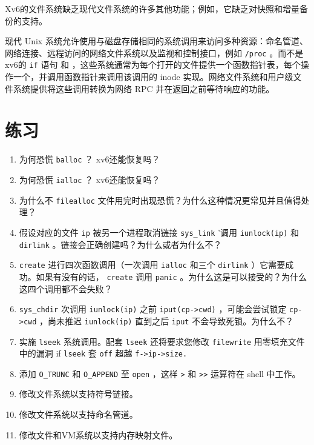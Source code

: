 \documentclass[UTF8]{article}
\begin{document}
Xv6的文件系统缺乏现代文件系统的许多其他功能；例如，它缺乏对快照和增量备份的支持。  

现代 Unix 系统允许使用与磁盘存储相同的系统调用来访问多种资源：命名管道、网络连接、远程访问的网络文件系统以及监视和控制接口，例如
    \lstinline{/proc}    。而不是xv6的
    \lstinline{if}    语句
        和
       ，这些系统通常为每个打开的文件提供一个函数指针表，每个操作一个，并调用函数指针来调用该调用的 inode 实现。网络文件系统和用户级文件系统提供将这些调用转换为网络 RPC 并在返回之前等待响应的功能。
    \section{练习  }     

   \begin{enumerate}


   \item   为何恐慌
    \lstinline{balloc}   ？ xv6还能恢复吗？   \item   为何恐慌
    \lstinline{ialloc}   ？ xv6还能恢复吗？   \item   为什么不
    \lstinline{filealloc}    文件用完时出现恐慌？为什么这种情况更常见并且值得处理？   \item   假设对应的文件
    \lstinline{ip}    被另一个进程取消链接
    \lstinline{sys_link}    '调用
    \lstinline{iunlock(ip)}    和
    \lstinline{dirlink}    。链接会正确创建吗？为什么或者为什么不？   \item      \lstinline{create}    进行四次函数调用（一次调用
    \lstinline{ialloc}    和三个
    \lstinline{dirlink}    ）它需要成功。如果有没有的话，
    \lstinline{create}    调用
    \lstinline{panic}    。为什么这是可以接受的？为什么这四个调用都不会失败？   \item      \lstinline{sys_chdir}    次调用
    \lstinline{iunlock(ip)}    之前
    \lstinline{iput(cp->cwd)}    ，可能会尝试锁定
    \lstinline{cp->cwd}   ，尚未推迟
    \lstinline{iunlock(ip)}    直到之后
    \lstinline{iput}    不会导致死锁。为什么不？   \item   实施
    \lstinline{lseek}    系统调用。配套
    \lstinline{lseek}    还将要求您修改
    \lstinline{filewrite}    用零填充文件中的漏洞 if
    \lstinline{lseek}   套
    \lstinline{off}    超越
    \lstinline{f->ip->size.}      \item   添加
    \lstinline{O_TRUNC}    和
    \lstinline{O_APPEND}    至
    \lstinline{open}    ，这样
    \lstinline{>}    和
    \lstinline{>>}    运算符在 shell 中工作。   \item   修改文件系统以支持符号链接。   \item   修改文件系统以支持命名管道。   \item   修改文件和VM系统以支持内存映射文件。  \end{enumerate}     
\end{document}
